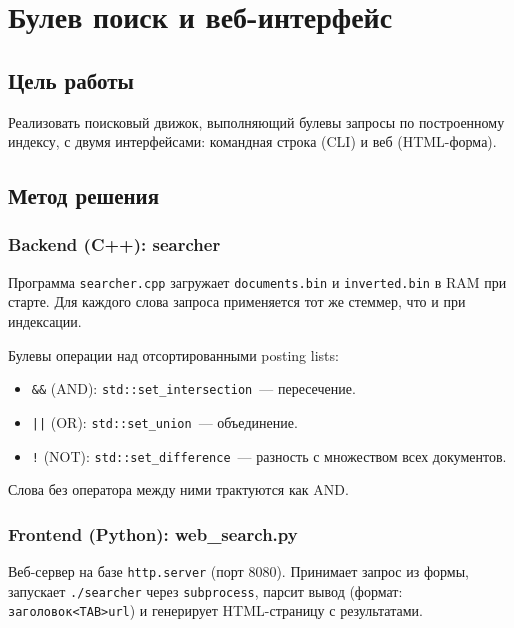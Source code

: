 \documentclass[12pt,a4paper]{article}
\begin{document}
\newpage


\section{Булев поиск и веб-интерфейс}

\subsection{Цель работы}

Реализовать поисковый движок, выполняющий булевы запросы по построенному индексу, с двумя интерфейсами: командная строка (CLI) и веб (HTML-форма).

\subsection{Метод решения}

\subsubsection{Backend (C++): searcher}

Программа \texttt{searcher.cpp} загружает \texttt{documents.bin} и \texttt{inverted.bin} в RAM при старте. Для каждого слова запроса применяется тот же стеммер, что и при индексации.

Булевы операции над отсортированными posting lists:
\begin{itemize}
    \item \texttt{\&\&} (AND): \texttt{std::set\_intersection}~--- пересечение.
    \item \texttt{||} (OR): \texttt{std::set\_union}~--- объединение.
    \item \texttt{!} (NOT): \texttt{std::set\_difference}~--- разность с множеством всех документов.
\end{itemize}

Слова без оператора между ними трактуются как AND.

\subsubsection{Frontend (Python): web\_search.py}

Веб-сервер на базе \texttt{http.server} (порт 8080). Принимает запрос из формы, запускает \texttt{./searcher} через \texttt{subprocess}, парсит вывод (формат: \texttt{заголовок<TAB>url}) и генерирует HTML-страницу с результатами.
\end{document}

